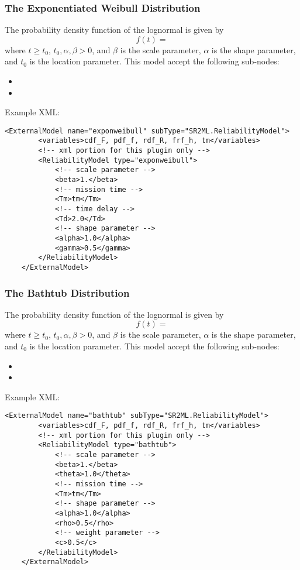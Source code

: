 \subsubsection{The Exponentiated Weibull Distribution}
The probability density function of the lognormal is given by
\begin{equation}
	f(t) =
\end{equation}
where $t\geq t_0$, $t_0, \alpha, \beta >0$, and $\beta$ is the scale parameter, $\alpha$ is the shape
parameter, and $t_0$ is the location parameter.
This model accept the following sub-nodes:
\begin{itemize}
	\item {}
	\item {}
\end{itemize}

Example XML:
\begin{lstlisting}[style=XML]
	<ExternalModel name="exponweibull" subType="SR2ML.ReliabilityModel">
		<variables>cdf_F, pdf_f, rdf_R, frf_h, tm</variables>
		<!-- xml portion for this plugin only -->
		<ReliabilityModel type="exponweibull">
			<!-- scale parameter -->
			<beta>1.</beta>
			<!-- mission time -->
			<Tm>tm</Tm>
			<!-- time delay -->
			<Td>2.0</Td>
			<!-- shape parameter -->
			<alpha>1.0</alpha>
			<gamma>0.5</gamma>
		</ReliabilityModel>
	</ExternalModel>
\end{lstlisting}


\subsubsection{The Bathtub Distribution}
The probability density function of the lognormal is given by
\begin{equation}
	f(t) =
\end{equation}
where $t\geq t_0$, $t_0, \alpha, \beta >0$, and $\beta$ is the scale parameter, $\alpha$ is the shape
parameter, and $t_0$ is the location parameter.
This model accept the following sub-nodes:
\begin{itemize}
	\item {}
	\item {}
\end{itemize}

Example XML:
\begin{lstlisting}[style=XML]
	<ExternalModel name="bathtub" subType="SR2ML.ReliabilityModel">
		<variables>cdf_F, pdf_f, rdf_R, frf_h, tm</variables>
		<!-- xml portion for this plugin only -->
		<ReliabilityModel type="bathtub">
			<!-- scale parameter -->
			<beta>1.</beta>
			<theta>1.0</theta>
			<!-- mission time -->
			<Tm>tm</Tm>
			<!-- shape parameter -->
			<alpha>1.0</alpha>
			<rho>0.5</rho>
			<!-- weight parameter -->
			<c>0.5</c>
		</ReliabilityModel>
	</ExternalModel>
\end{lstlisting}


